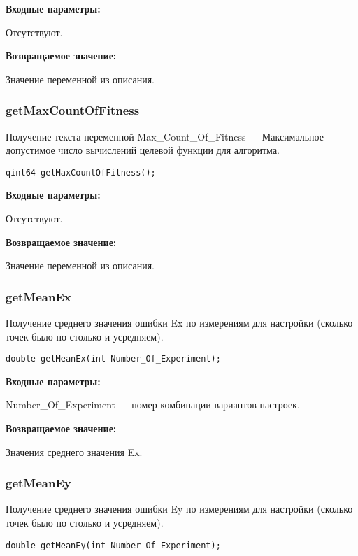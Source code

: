 \textbf{Входные параметры:}

Отсутствуют.

\textbf{Возвращаемое значение:}

Значение переменной из описания.


\subsubsection{getMaxCountOfFitness}\label{getMaxCountOfFitness}

Получение текста переменной  Max\_Count\_Of\_Fitness --- Максимальное допустимое число вычислений целевой функции для алгоритма.


\begin{lstlisting}[label=code_syntax_getMaxCountOfFitness,caption=Синтаксис]
qint64 getMaxCountOfFitness();
\end{lstlisting}

\textbf{Входные параметры:}

Отсутствуют.

\textbf{Возвращаемое значение:}

Значение переменной из описания.


\subsubsection{getMeanEx}\label{getMeanEx}

Получение среднего значения ошибки Ex по измерениям для настройки (сколько точек было по столько и усредняем).


\begin{lstlisting}[label=code_syntax_getMeanEx,caption=Синтаксис]
double getMeanEx(int Number_Of_Experiment);
\end{lstlisting}

\textbf{Входные параметры:}

Number\_Of\_Experiment --- номер комбинации вариантов настроек.

\textbf{Возвращаемое значение:}

Значения среднего значения Ex.


\subsubsection{getMeanEy}\label{getMeanEy}

Получение среднего значения ошибки Ey по измерениям для настройки (сколько точек было по столько и усредняем).


\begin{lstlisting}[label=code_syntax_getMeanEy,caption=Синтаксис]
double getMeanEy(int Number_Of_Experiment);
\end{lstlisting}

